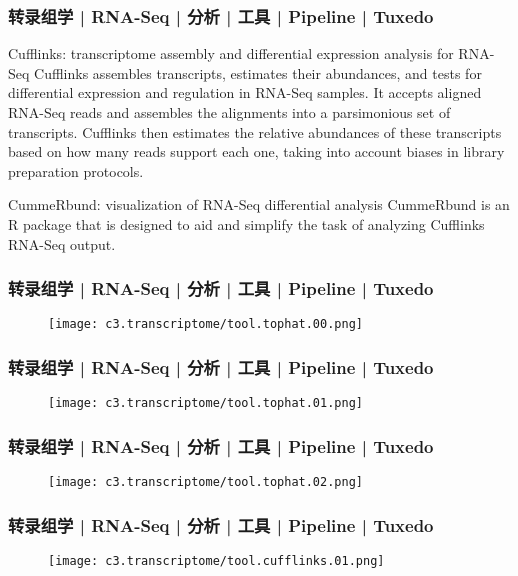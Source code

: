 \begin{frame}
  \frametitle{转录组学 | RNA-Seq | 分析 | 工具 | Pipeline | Tuxedo}
  \begin{block}{Cufflinks: transcriptome assembly and differential expression analysis for RNA-Seq}
    Cufflinks assembles transcripts, estimates their abundances, and tests for differential expression and regulation in RNA-Seq samples. It accepts aligned RNA-Seq reads and assembles the alignments into a parsimonious set of transcripts. Cufflinks then estimates the relative abundances of these transcripts based on how many reads support each one, taking into account biases in library preparation protocols.
  \end{block}
  \pause
  \begin{block}{CummeRbund: visualization of RNA-Seq differential analysis}
    CummeRbund is an R package that is designed to aid and simplify the task of analyzing Cufflinks RNA-Seq output.
  \end{block}
\end{frame}

\begin{frame}
  \frametitle{转录组学 | RNA-Seq | 分析 | 工具 | Pipeline | Tuxedo}
  \begin{figure}
    \centering
    \texttt{[image: c3.transcriptome/tool.tophat.00.png]}
  \end{figure}
\end{frame}

\begin{frame}
  \frametitle{转录组学 | RNA-Seq | 分析 | 工具 | Pipeline | Tuxedo}
  \begin{figure}
    \centering
    \texttt{[image: c3.transcriptome/tool.tophat.01.png]}
  \end{figure}
\end{frame}

\begin{frame}
  \frametitle{转录组学 | RNA-Seq | 分析 | 工具 | Pipeline | Tuxedo}
  \begin{figure}
    \centering
    \texttt{[image: c3.transcriptome/tool.tophat.02.png]}
  \end{figure}
\end{frame}

\begin{frame}
  \frametitle{转录组学 | RNA-Seq | 分析 | 工具 | Pipeline | Tuxedo}
  \begin{figure}
    \centering
    \texttt{[image: c3.transcriptome/tool.cufflinks.01.png]}
  \end{figure}
\end{frame}

